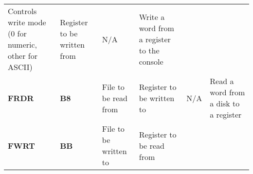 \documentclass[]{article}
\begin{document}
\begin{longtable}[c]{@{}llllll@{}}
\begin{minipage}[t]{0.14\columnwidth}\raggedright\strut
Controls write mode (0 for numeric, other for ASCII)
\strut\end{minipage} &
\begin{minipage}[t]{0.14\columnwidth}\raggedright\strut
Register to be written from
\strut\end{minipage} &
\begin{minipage}[t]{0.14\columnwidth}\raggedright\strut
N/A
\strut\end{minipage} &
\begin{minipage}[t]{0.14\columnwidth}\raggedright\strut
Write a word from a register to the console
\strut\end{minipage}\tabularnewline
\begin{minipage}[t]{0.14\columnwidth}\raggedright\strut
\textbf{FRDR}
\strut\end{minipage} &
\begin{minipage}[t]{0.14\columnwidth}\raggedright\strut
\textbf{B8}
\strut\end{minipage} &
\begin{minipage}[t]{0.14\columnwidth}\raggedright\strut
File to be read from
\strut\end{minipage} &
\begin{minipage}[t]{0.14\columnwidth}\raggedright\strut
Register to be written to
\strut\end{minipage} &
\begin{minipage}[t]{0.14\columnwidth}\raggedright\strut
N/A
\strut\end{minipage} &
\begin{minipage}[t]{0.14\columnwidth}\raggedright\strut
Read a word from a disk to a register
\strut\end{minipage}\tabularnewline
\begin{minipage}[t]{0.14\columnwidth}\raggedright\strut
\textbf{FWRT}
\strut\end{minipage} &
\begin{minipage}[t]{0.14\columnwidth}\raggedright\strut
\textbf{BB}
\strut\end{minipage} &
\begin{minipage}[t]{0.14\columnwidth}\raggedright\strut
File to be written to
\strut\end{minipage} &
\begin{minipage}[t]{0.14\columnwidth}\raggedright\strut
Register to be read from
\strut\end{minipage} &
\begin{minipage}[t]{0.14\columnwidth}\raggedright\strut

\end{minipage}
\end{longtable}
\end{document}
